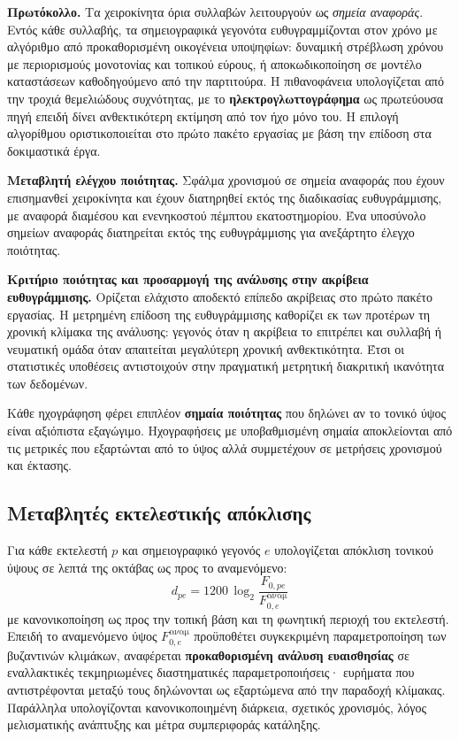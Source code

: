 \documentclass[11pt,a4paper]{article}
\begin{document}
\textbf{Πρωτόκολλο.} Τα χειροκίνητα όρια συλλαβών λειτουργούν ως \emph{σημεία αναφοράς}. Εντός κάθε συλλαβής, τα σημειογραφικά γεγονότα ευθυγραμμίζονται στον χρόνο με αλγόριθμο από προκαθορισμένη οικογένεια υποψηφίων: δυναμική στρέβλωση χρόνου με περιορισμούς μονοτονίας και τοπικού εύρους, ή αποκωδικοποίηση σε μοντέλο καταστάσεων καθοδηγούμενο από την παρτιτούρα. Η πιθανοφάνεια υπολογίζεται από την τροχιά θεμελιώδους συχνότητας, με το \textbf{ηλεκτρογλωττογράφημα} ως πρωτεύουσα πηγή επειδή δίνει ανθεκτικότερη εκτίμηση από τον ήχο μόνο του. Η επιλογή αλγορίθμου οριστικοποιείται στο πρώτο πακέτο εργασίας με βάση την επίδοση στα δοκιμαστικά έργα.

\textbf{Μεταβλητή ελέγχου ποιότητας.} Σφάλμα χρονισμού σε σημεία αναφοράς που έχουν επισημανθεί χειροκίνητα και έχουν διατηρηθεί εκτός της διαδικασίας ευθυγράμμισης, με αναφορά διαμέσου και ενενηκοστού πέμπτου εκατοστημορίου. Ένα υποσύνολο σημείων αναφοράς διατηρείται εκτός της ευθυγράμμισης για ανεξάρτητο έλεγχο ποιότητας.

\textbf{Κριτήριο ποιότητας και προσαρμογή της ανάλυσης στην ακρίβεια ευθυγράμμισης.} Ορίζεται ελάχιστο αποδεκτό επίπεδο ακρίβειας στο πρώτο πακέτο εργασίας. Η μετρημένη επίδοση της ευθυγράμμισης καθορίζει εκ των προτέρων τη χρονική κλίμακα της ανάλυσης: γεγονός όταν η ακρίβεια το επιτρέπει και συλλαβή ή νευματική ομάδα όταν απαιτείται μεγαλύτερη χρονική ανθεκτικότητα. Έτσι οι στατιστικές υποθέσεις αντιστοιχούν στην πραγματική μετρητική διακριτική ικανότητα των δεδομένων.

Κάθε ηχογράφηση φέρει επιπλέον \textbf{σημαία ποιότητας} που δηλώνει αν το τονικό ύψος είναι αξιόπιστα εξαγώγιμο. Ηχογραφήσεις με υποβαθμισμένη σημαία αποκλείονται από τις μετρικές που εξαρτώνται από το ύψος αλλά συμμετέχουν σε μετρήσεις χρονισμού και έκτασης.

\subsection{Μεταβλητές εκτελεστικής απόκλισης}\label{app:impl-vars}

Για κάθε εκτελεστή \(p\) και σημειογραφικό γεγονός \(e\) υπολογίζεται απόκλιση τονικού ύψους σε λεπτά της οκτάβας ως προς το αναμενόμενο:
\[
d_{pe}=1200\,\log_2\!\frac{F_{0,pe}}{F^{\text{αναμ}}_{0,e}}
\]
με κανονικοποίηση ως προς την τοπική βάση και τη φωνητική περιοχή του εκτελεστή. Επειδή το αναμενόμενο ύψος \(F^{\text{αναμ}}_{0,e}\) προϋποθέτει συγκεκριμένη παραμετροποίηση των βυζαντινών κλιμάκων, αναφέρεται \textbf{προκαθορισμένη ανάλυση ευαισθησίας} σε εναλλακτικές τεκμηριωμένες διαστηματικές παραμετροποιήσεις· ευρήματα που αντιστρέφονται μεταξύ τους δηλώνονται ως εξαρτώμενα από την παραδοχή κλίμακας. Παράλληλα υπολογίζονται κανονικοποιημένη διάρκεια, σχετικός χρονισμός, λόγος μελισματικής ανάπτυξης και μέτρα συμπεριφοράς κατάληξης.
\end{document}
